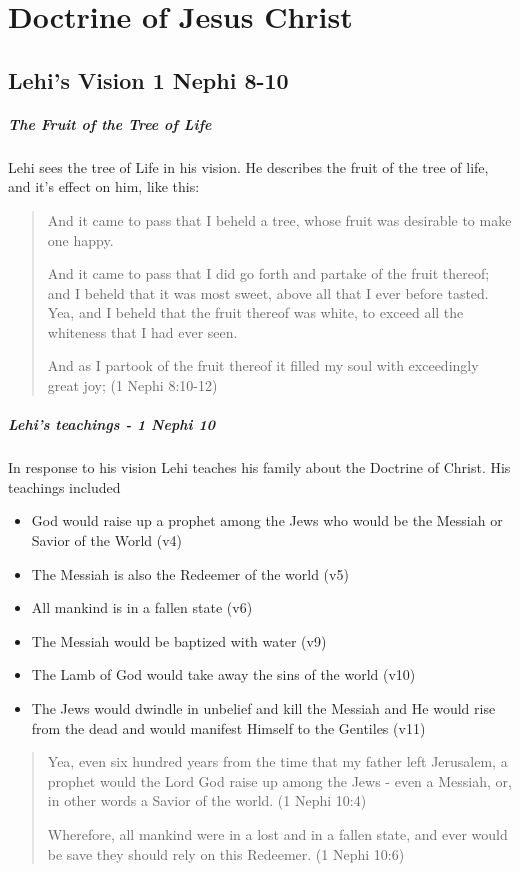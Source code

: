 \chapter{Doctrine of Jesus Christ}

\section{Lehi's Vision 1 Nephi 8-10}

\paragraph{The Fruit of the Tree of Life}
Lehi sees the tree of Life in his vision. He describes the fruit of the tree of life, and it's effect on him, like this:

\begin{quotation}
And it came to pass that I beheld a tree, whose fruit was desirable to make one happy.

And it came to pass that I did go forth and partake of the fruit thereof; and I beheld that it was most sweet, above all that I ever before tasted. Yea, and I beheld that the fruit thereof was white, to exceed all the whiteness that I had ever seen.

And as I partook of the fruit thereof it filled my soul with exceedingly great joy; (1 Nephi 8:10-12)
\end{quotation}

\paragraph{Lehi's teachings - 1 Nephi 10}

In response to his vision Lehi teaches his family about the Doctrine of Christ. His teachings included

\begin{itemize}
  \item{God would raise up a prophet among the Jews who would be the Messiah or Savior of the World (v4)}
  \item{The Messiah is also the Redeemer of the world (v5)}
  \item{All mankind is in a fallen state (v6)}
  \item{The Messiah would be baptized with water (v9)}
  \item{The Lamb of God would take away the sins of the world (v10)}
  \item{The Jews would dwindle in unbelief and kill the Messiah and He would rise from the dead and would manifest Himself to the Gentiles (v11)}
\end{itemize}

\begin{quotation}
Yea, even six hundred years from the time that my father left Jerusalem, a prophet would the Lord God raise up among the Jews - even a Messiah, or, in other words a Savior of the world. (1 Nephi 10:4)

Wherefore, all mankind were in a lost and in a fallen state, and ever would be save they should rely on this Redeemer. (1 Nephi 10:6)
\end{quotation}



